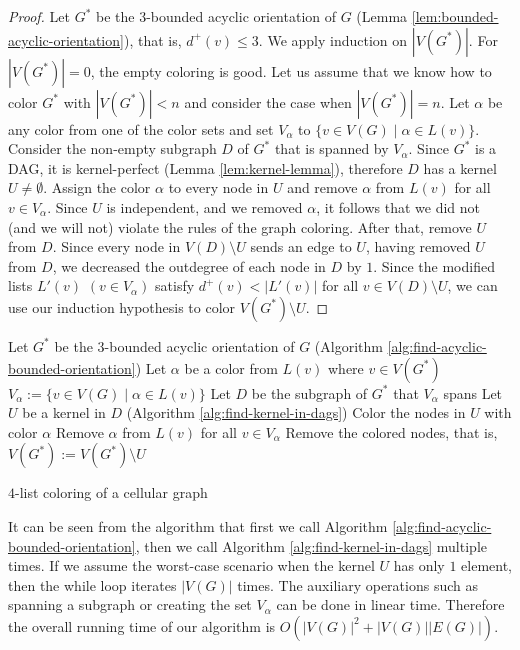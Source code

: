 \documentclass[a4paper, 12pt]{article}
\begin{document}
\begin{proof}
Let $G^*$ be the $3$-bounded acyclic orientation of $G$ (Lemma \ref{lem:bounded-acyclic-orientation}), that is, $d^+(v) \leqslant 3$. We apply induction on $|V(G^*)|$. For $|V(G^*)|=0$, the empty coloring is good. Let us assume that we know how to color $G^*$ with $|V(G^*)| < n$ and consider the case when $|V(G^*)|=n$. Let $\alpha$ be any color from one of the color sets and set $V_\alpha$ to $\lbrace v \in V(G) \mid \alpha \in L(v) \rbrace$. Consider the non-empty subgraph $D$ of $G^*$ that is spanned by $V_\alpha$. Since $G^*$ is a DAG, it is kernel-perfect (Lemma \ref{lem:kernel-lemma}), therefore $D$ has a kernel $U \neq \emptyset$. Assign the color $\alpha$ to every node in $U$ and remove $\alpha$ from $L(v)$ for all $v \in V_\alpha$. Since $U$ is independent, and we removed $\alpha$, it follows that we did not (and we will not) violate the rules of the graph coloring. After that, remove $U$ from $D$. Since every node in $V(D) \setminus U$ sends an edge to $U$, having removed $U$ from $D$, we decreased the outdegree of each node in $D$ by $1$. Since the modified lists $L'(v)$ $(v \in V_\alpha)$ satisfy $d^+(v) < |L'(v)|$ for all $v \in V(D) \setminus U$, we can use our induction hypothesis to color $V(G^*) \setminus U$.
\end{proof}
\begin{algorithm}[h!]\label{alg:four-list-coloring}
  Let $G^*$ be the $3$-bounded acyclic orientation of $G$ (Algorithm \ref{alg:find-acyclic-bounded-orientation})\;
   {
  	Let $\alpha$ be a color from $L(v)$ where $v \in V(G^*)$\;
  	$V_\alpha := \lbrace v \in V(G) \mid \alpha \in L(v) \rbrace$\;
  	Let $D$ be the subgraph of $G^*$ that $V_\alpha$ spans\;
  	Let $U$ be a kernel in $D$ (Algorithm \ref{alg:find-kernel-in-dags})\;
  	Color the nodes in $U$ with color $\alpha$\;
  	Remove $\alpha$ from $L(v)$ for all $v \in V_\alpha$\;
  	Remove the colored nodes, that is, $V(G^*) := V(G^*) \setminus U$\;
  }
 \caption{$4$-list coloring of a cellular graph}
\end{algorithm}

It can be seen from the algorithm that first we call Algorithm \ref{alg:find-acyclic-bounded-orientation}, then we call Algorithm \ref{alg:find-kernel-in-dags} multiple times. If we assume the worst-case scenario when the kernel $U$ has only $1$ element, then the while loop iterates $|V(G)|$ times. The auxiliary operations such as spanning a subgraph or creating the set $V_\alpha$ can be done in linear time. Therefore the overall running time of our algorithm is $O(|V(G)|^2+|V(G)||E(G)|)$.
\end{document}
